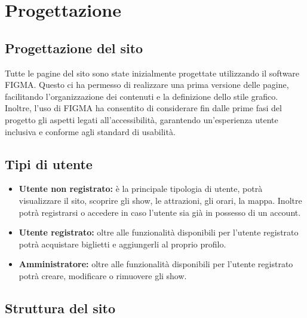 \section{Progettazione}

\subsection{Progettazione del sito}
Tutte le pagine del sito sono state inizialmente progettate utilizzando il software FIGMA. Questo ci ha permesso di realizzare una prima versione delle pagine, facilitando l'organizzazione dei contenuti e la definizione dello stile grafico. Inoltre, l'uso di FIGMA ha consentito di considerare fin dalle prime fasi del progetto gli aspetti legati all'accessibilità, garantendo un'esperienza utente inclusiva e conforme agli standard di usabilità.

\subsection{Tipi di utente}
\begin{itemize}
    \item \textbf{Utente non registrato:} è la principale tipologia di utente, potrà visualizzare il sito, scoprire gli show, le attrazioni, gli orari, la mappa. Inoltre potrà registrarsi o accedere in caso l'utente sia già in possesso di un account.
    \item \textbf{Utente registrato:} oltre alle funzionalità disponibili per l'utente registrato potrà acquistare biglietti e aggiungerli al proprio profilo.
    \item \textbf{Amministratore:} oltre alle funzionalità disponibili per l'utente registrato potrà creare, modificare o rimuovere gli show.
\end{itemize}

\subsection{Struttura del sito}
